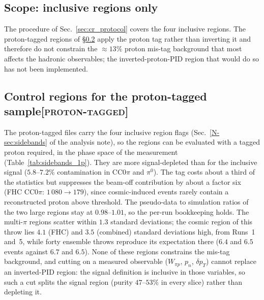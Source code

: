 \documentclass[11pt,a4paper]{article}
\newcommand{\noteref}[2]{#1~\ref{N-#2} of the analysis note}
\newcommand{\scopetag}[1]{\hfill{\normalfont\small\textsc{[#1]}}}
\begin{document}
\subsection{Scope: inclusive regions only}
\label{sec:cr_1p_scope}
The procedure of Sec.~\ref{sec:cr_protocol} covers the four inclusive regions. The proton-tagged regions of
\S\ref{sec:sidebands_1p} apply the proton tag rather than inverting it and therefore do not constrain the
$\approx\!13\%$ proton mis-tag background that most affects the hadronic observables; the
inverted-proton-PID region that would do so has not been implemented.

\subsection[Control regions for the proton-tagged sample]{Control regions for the proton-tagged sample\scopetag{proton-tagged}}
\label{sec:sidebands_1p}

The proton-tagged files carry the four inclusive region flags (\noteref{Sec.}{sec:sidebands}), so the
regions can be evaluated with a tagged proton required, in the phase space of the measurement
(Table~\ref{tab:sidebands_1p}). They are more signal-depleted than for the inclusive signal ($5.8$--$7.2\%$
contamination in CC$0\pi$ and $\pi^0$). The tag costs about a third of the statistics but suppresses the
beam-off contribution by about a factor six (FHC CC$0\pi$: $1\,080\to179$), since cosmic-induced events
rarely contain a reconstructed proton above threshold. The pseudo-data to simulation ratios of the two
large regions stay at $0.98$--$1.01$, so the per-run bookkeeping holds. The multi-$\pi$ regions scatter
within $1.3$ standard deviations; the cosmic region of this throw lies $4.1$ (FHC) and $3.5$ (combined)
standard deviations high, from Runs~1 and~5, while forty ensemble throws reproduce its expectation there
($6.4$ and $6.5$ events against $6.7$ and $6.5$). None of these regions constrains the mis-tag
background, and cutting on a measured observable ($W_{\pi p}$, $p_n$, $\delta p_T$) cannot replace an
inverted-PID region: the signal definition is inclusive in those variables, so such a cut splits the
signal region (purity $47$--$53\%$ in every slice) rather than depleting it.
\end{document}
